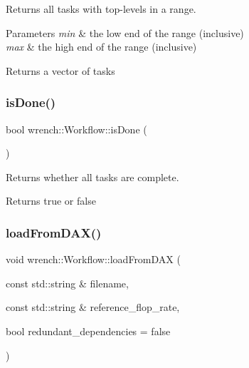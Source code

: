 Returns all tasks with top-\/levels in a range. 


\begin{DoxyParams}{Parameters}
{\em min} & the low end of the range (inclusive) \\
\hline
{\em max} & the high end of the range (inclusive) \\
\hline
\end{DoxyParams}
\begin{DoxyReturn}{Returns}
a vector of tasks 
\end{DoxyReturn}
\mbox{\label{classwrench_1_1_workflow_afc59b67119511acac649652d560f238a}} 
\subsubsection{\texorpdfstring{is\+Done()}{isDone()}}
{\footnotesize\ttfamily bool wrench\+::\+Workflow\+::is\+Done (\begin{DoxyParamCaption}{ }\end{DoxyParamCaption})}



Returns whether all tasks are complete. 

\begin{DoxyReturn}{Returns}
true or false 
\end{DoxyReturn}
\mbox{\label{classwrench_1_1_workflow_ac7048676d96d85a4f59580d4f77da935}} 
\subsubsection{\texorpdfstring{load\+From\+D\+A\+X()}{loadFromDAX()}}
{\footnotesize\ttfamily void wrench\+::\+Workflow\+::load\+From\+D\+AX (\begin{DoxyParamCaption}\item[{const std\+::string \&}]{filename,  }\item[{const std\+::string \&}]{reference\+\_\+flop\+\_\+rate,  }\item[{bool}]{redundant\+\_\+dependencies = {\ttfamily false} }\end{DoxyParamCaption})}



